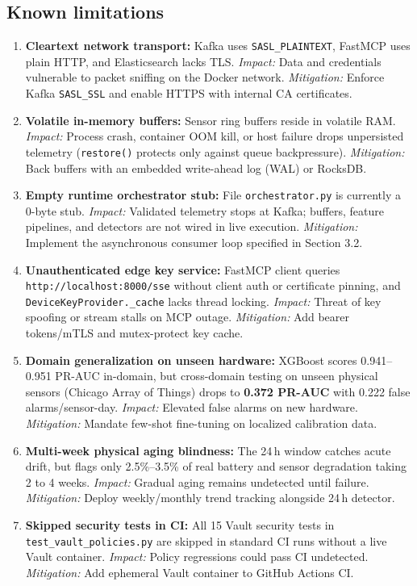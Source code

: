 \documentclass[11pt,a4paper]{article}
\begin{document}
\subsection{Known limitations}
\begin{enumerate}[leftmargin=*,itemsep=2pt,topsep=2pt]
  \item \textbf{Cleartext network transport:} Kafka uses \texttt{SASL\_PLAINTEXT}, FastMCP uses plain HTTP, and Elasticsearch lacks TLS. \textit{Impact:} Data and credentials vulnerable to packet sniffing on the Docker network. \textit{Mitigation:} Enforce Kafka \texttt{SASL\_SSL} and enable HTTPS with internal CA certificates.
  \item \textbf{Volatile in-memory buffers:} Sensor ring buffers reside in volatile RAM. \textit{Impact:} Process crash, container OOM kill, or host failure drops unpersisted telemetry (\texttt{restore()} protects only against queue backpressure). \textit{Mitigation:} Back buffers with an embedded write-ahead log (WAL) or RocksDB.
  \item \textbf{Empty runtime orchestrator stub:} File \texttt{orchestrator.py} is currently a 0-byte stub. \textit{Impact:} Validated telemetry stops at Kafka; buffers, feature pipelines, and detectors are not wired in live execution. \textit{Mitigation:} Implement the asynchronous consumer loop specified in Section 3.2.
  \item \textbf{Unauthenticated edge key service:} FastMCP client queries \texttt{http://localhost:8000/sse} without client auth or certificate pinning, and \texttt{DeviceKeyProvider.\_cache} lacks thread locking. \textit{Impact:} Threat of key spoofing or stream stalls on MCP outage. \textit{Mitigation:} Add bearer tokens/mTLS and mutex-protect key cache.
  \item \textbf{Domain generalization on unseen hardware:} XGBoost scores 0.941--0.951 PR-AUC in-domain, but cross-domain testing on unseen physical sensors (Chicago Array of Things) drops to \textbf{0.372 PR-AUC} with 0.222 false alarms/sensor-day. \textit{Impact:} Elevated false alarms on new hardware. \textit{Mitigation:} Mandate few-shot fine-tuning on localized calibration data.
  \item \textbf{Multi-week physical aging blindness:} The 24\,h window catches acute drift, but flags only 2.5\%--3.5\% of real battery and sensor degradation taking 2 to 4 weeks. \textit{Impact:} Gradual aging remains undetected until failure. \textit{Mitigation:} Deploy weekly/monthly trend tracking alongside 24\,h detector.
  \item \textbf{Skipped security tests in CI:} All 15 Vault security tests in \texttt{test\_vault\_policies.py} are skipped in standard CI runs without a live Vault container. \textit{Impact:} Policy regressions could pass CI undetected. \textit{Mitigation:} Add ephemeral Vault container to GitHub Actions CI.

\end{enumerate}
\end{document}
